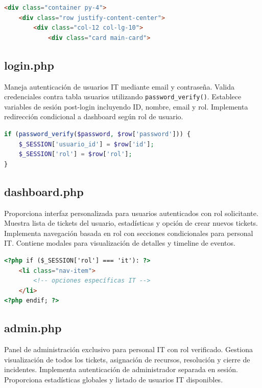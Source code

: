 \documentclass[12pt,a4paper]{article}
\begin{document}
\begin{lstlisting}[language=HTML,caption={Estructura portal público}]
<div class="container py-4">
    <div class="row justify-content-center">
        <div class="col-12 col-lg-10">
            <div class="card main-card">
\end{lstlisting}

\subsection{login.php}

Maneja autenticación de usuarios IT mediante email y contraseña. Valida credenciales contra tabla usuarios utilizando \texttt{password\_verify()}. Establece variables de sesión post-login incluyendo ID, nombre, email y rol. Implementa redirección condicional a dashboard según rol de usuario.

\begin{lstlisting}[language=PHP,caption={Validación de credenciales}]
if (password_verify($password, $row['password'])) {
    $_SESSION['usuario_id'] = $row['id'];
    $_SESSION['rol'] = $row['rol'];
}
\end{lstlisting}

\subsection{dashboard.php}

Proporciona interfaz personalizada para usuarios autenticados con rol solicitante. Muestra lista de tickets del usuario, estadísticas y opción de crear nuevos tickets. Implementa navegación basada en rol con secciones condicionales para personal IT. Contiene modales para visualización de detalles y timeline de eventos.

\begin{lstlisting}[language=HTML,caption={Navbar condicional}]
<?php if ($_SESSION['rol'] === 'it'): ?>
    <li class="nav-item">
        <!-- opciones específicas IT -->
    </li>
<?php endif; ?>
\end{lstlisting}

\subsection{admin.php}

Panel de administración exclusivo para personal IT con rol verificado. Gestiona visualización de todos los tickets, asignación de recursos, resolución y cierre de incidentes. Implementa autenticación de administrador separada en sesión. Proporciona estadísticas globales y listado de usuarios IT disponibles.
\end{document}
